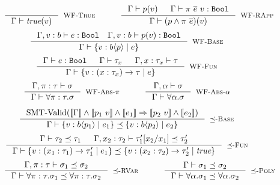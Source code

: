 \begin{figure}[p]
\centering
\captionsetup{justification=centering}

$$\begin{array}{ccc}
\inference
  {}
  {\isWellFormed{\Gamma}{\true(\vref)}}
  [\wtTrue]
&
\quad
&
\inference
    {\isWellFormed{\Gamma}{\areft(\vref)} && 
     \hastype{\Gamma}{\rvapp{\rvar}{e} \ \vref}{\tbbool}
    }
    {\isWellFormed{\Gamma}{(\areft \wedge \rvapp{\rvar}{e})(\vref)}}
    [\wtRVApp]
\end{array}$$
%
$$\inference
    {\hastype{\Gamma, \vref:b}{\reft}{\tbbool} \quad 
     \hastype{\Gamma, \vref:b}{\areft(\vref)}{\tbbool}
    }
    {\isWellFormed{\Gamma}{\tpref{b}{\areft}{\reft}}}
    [\wtBase]
$$
%
$$
\inference
    {
	\hastype{\Gamma}{\reft}{\tbbool} &&
    \isWellFormed{\Gamma}{\tau_x} &&
	\isWellFormed{\Gamma, x:\tau_x}{\tau}
    }
    {\isWellFormed{\Gamma}{\trfun{x}{\tau_x}{\tau}{\reft}}}
    [\wtFun]
$$
%
$$\begin{array}{ccc}
\inference
  {\isWellFormed{\Gamma, \rvar:\tau}{\sigma}}
  {\isWellFormed{\Gamma}{\tpabs{\rvar}{\tau}{\sigma}}}
  [\wtPred]
&
\quad
&
\inference
    {\isWellFormed{\Gamma, \alpha}{\sigma}}
    {\isWellFormed{\Gamma}{\ttabs{\alpha}{\sigma}}}
    [\wtPoly]
\end{array}$$

\medskip {}

$$
\inference
   {\text{SMT-Valid}(\inter{\Gamma} \land \inter{\areft_1\ \vref} \land \inter{\reft_1} 
                 \Rightarrow \inter{\areft_2\ \vref} \land \inter{\reft_2})}
   {\isSubType{\Gamma}{\tpref{b}{\areft_1}{\reft_1}}{\tpref{b}{\areft_2}{\reft_2}}}
   [\tsubBase]
$$
%
$$
\inference
   {%
	\isSubType{\Gamma}{\tau_2}{\tau_1} &
	\isSubType{\Gamma, x_2:{\tau_2}}{\SUBST{\tau_1'}{x_1}{x_2}}{\tau_2'}	
   }
   {\isSubType{\Gamma}
	  {\trfun{x_1}{\tau_1}{\tau_1'}{\reft_1}}
	  {\trfun{x_2}{\tau_2}{\tau_2'}{\true}}
}[\tsubFun]
$$
%
$$
\begin{array}{ccc}
\inference
   {\isSubType{\Gamma, \rvar:\tau}{\sigma_1}{\sigma_2}}
   {\isSubType{\Gamma}{\tpabs{\rvar}{\tau}{\sigma_1}}{\tpabs{\rvar}{\tau}{\sigma_2}}}
   [\tsubPred]
&
\quad
&
\inference
   {\isSubType{\Gamma}{\sigma_1}{\sigma_2}}
   {\isSubType{\Gamma}{\ttabs{\alpha}{\sigma_1}}{\ttabs{\alpha}{\sigma_2}}}
   [\tsubPoly]
\end{array}
$$


\end{figure}
